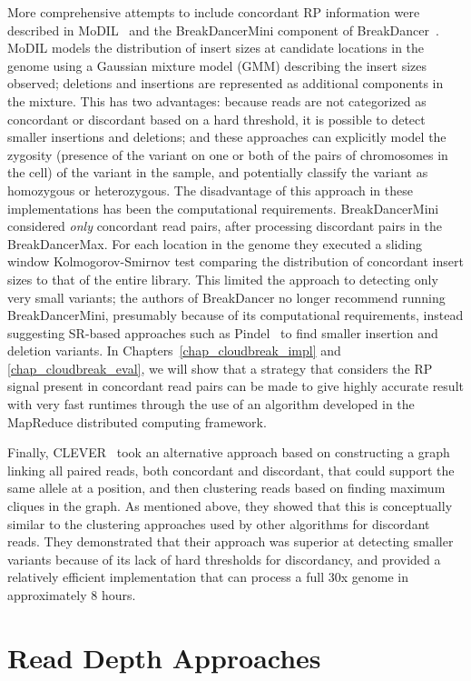 More comprehensive attempts to include concordant RP information were described in MoDIL~\cite{Lee:2009da} and the BreakDancerMini component of BreakDancer~\cite{Chen:2009p3}. MoDIL models the distribution of insert sizes at candidate locations in the genome using a Gaussian mixture model (GMM) describing the insert sizes observed; deletions and insertions are represented as additional components in the mixture. This has two advantages: because reads are not categorized as concordant or discordant based on a hard threshold, it is possible to detect smaller insertions and deletions; and these approaches can explicitly model the zygosity (presence of the variant on one or both of the pairs of chromosomes in the cell) of the variant in the sample, and potentially classify the variant as homozygous or heterozygous. The disadvantage of this approach in these implementations has been the computational requirements. BreakDancerMini considered \emph{only} concordant read pairs, after processing discordant pairs in the BreakDancerMax. For each location in the genome they executed a sliding window Kolmogorov-Smirnov test comparing the distribution of concordant insert sizes to that of the entire library. This limited the approach to detecting only very small variants; the authors of BreakDancer no longer recommend running BreakDancerMini, presumably because of its computational requirements, instead suggesting SR-based approaches such as Pindel~\cite{Ye:2009p2} to find smaller insertion and deletion variants. In Chapters~\ref{chap_cloudbreak_impl} and \ref{chap_cloudbreak_eval}, we will show that a strategy that considers the RP signal present in concordant read pairs can be made to give highly accurate result with very fast runtimes through the use of an algorithm developed in the MapReduce distributed computing framework.

Finally, CLEVER~\cite{Marschall:2012ek} took an alternative approach based on constructing a graph linking all paired reads, both concordant and discordant, that could support the same allele at a position, and then clustering reads based on finding maximum cliques in the graph. As mentioned above, they showed that this is conceptually similar to the clustering approaches used by other algorithms for discordant reads. They demonstrated that their approach was superior at detecting smaller variants because of its lack of hard thresholds for discordancy, and provided a relatively efficient implementation that can process a full 30x genome in approximately 8 hours.

\section{Read Depth Approaches}

